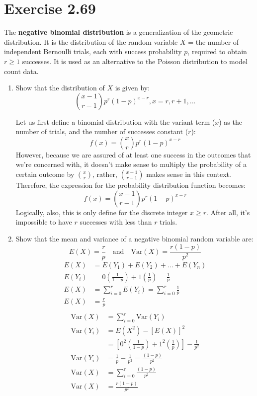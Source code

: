 \documentclass{article}
\newcommand{\var}{\text{Var}}
\begin{document}
\section*{Exercise 2.69}
The \textbf{negative binomial distribution} is a generalization of the geometric distribution. It is the distribution of the random variable $X$ = the number of independent Bernoulli trials, each with success probability $p$, required to obtain $r \geq 1$ successes. It is used as an alternative to the Poisson distribution to model count data.

\begin{enumerate}[\quad(a)]
	\item Show that the distribution of $X$ is given by:
	\[ \binom{x-1}{r-1} p^r (1-p)^{x-r}, x = r, r+1, ... \]
	
	Let us first define a binomial distribution with the variant term ($x$) as the number of trials, and the number of successes constant ($r$):
	\[ f(x) = \binom{x}{r} p^r(1-p)^{x-r} \]
	However, because we are assured of at least one success in the outcomes that we're concerned with, it doesn't make sense to multiply the probability of a certain outcome by $\binom{x}{r}$, rather, $\binom{x-1}{r-1}$ makes sense in this context. Therefore, the expression for the probability distribution function becomes:
	\[ f(x) = \binom{x-1}{r-1} p^r(1-p)^{x-r} \]
	Logically, also, this is only define for the discrete integer $x \geq r$. After all, it's impossible to have $r$ successes with less than $r$ trials.
	
	\item Show that the mean and variance of a negative binomial random variable are:
	\[ E(X) = \frac{r}{p} \quad \text{and} \quad \var(X) = \frac{r(1-p)}{p^2} \]
	\begin{align*}
		E(X) &= E(Y_1) + E(Y_2) + ... + E(Y_n)\\
		E(Y_i) &= 0\left( \frac{1}{1-p} \right) + 1\left( \frac{1}{p} \right)  =\frac{1}{p}\\
		E(X) &= \sum_{i = 0}^r E(Y_i) = \sum_{i = 0}^r \frac{1}{p}\\
		E(X) &= \frac{r}{p}\\
	\end{align*}
	\begin{align*}
		\var(X) &= \sum_{i = 0}^r \var(Y_i)\\
		\var(Y_i) &= E(X^2) - [E(X)]^2\\
		&= \left[ 0^2\left( \frac{1}{1-p} \right) + 1^2\left( \frac{1}{p} \right) \right] - \frac{1}{p^2}\\
		\var(Y_i) &= \frac{1}{p} - \frac{1}{p^2} = \frac{(1-p)}{p^2}\\
		\var(X) &= \sum_{i = 0}^r \frac{(1-p)}{p^2}\\
		\var(X) &= \frac{r(1-p)}{p^2}
	\end{align*}
\end{enumerate}
	
\end{document}
